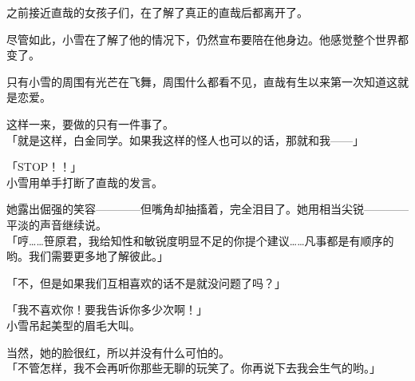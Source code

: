 之前接近直哉的女孩子们，在了解了真正的直哉后都离开了。

尽管如此，小雪在了解了他的情况下，仍然宣布要陪在他身边。他感觉整个世界都变了。

只有小雪的周围有光芒在飞舞，周围什么都看不见，直哉有生以来第一次知道这就是恋爱。

这样一来，要做的只有一件事了。\\

「就是这样，白金同学。如果我这样的怪人也可以的话，那就和我——」

「STOP！！」\\

小雪用单手打断了直哉的发言。

她露出倔强的笑容————但嘴角却抽搐着，完全泪目了。她用相当尖锐————平淡的声音继续说。\\

「哼……笹原君，我给知性和敏锐度明显不足的你提个建议……凡事都是有顺序的哟。我们需要更多地了解彼此。」

「不，但是如果我们互相喜欢的话不是就没问题了吗？」

「我不喜欢你！要我告诉你多少次啊！」\\

小雪吊起美型的眉毛大叫。

当然，她的脸很红，所以并没有什么可怕的。\\

「不管怎样，我不会再听你那些无聊的玩笑了。你再说下去我会生气的哟。」

